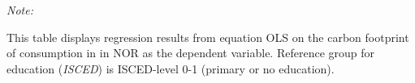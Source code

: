 \begin{table}[htbp!]
\begin{adjustbox}{width = 1\textwidth, max height = 0.95\textheight, center}
\begin{threeparttable}[b]
         \begin{tablenotes}\item \medskip \textit{Note:}
            \item This table displays regression results from equation OLS on the carbon footprint of consumption in  in NOR as the dependent variable.  Reference group for education (\textit{ISCED}) is ISCED-level 0-1 (primary or no education).
         \end{tablenotes}
      \end{threeparttable}
   \end{adjustbox}
\end{table}


